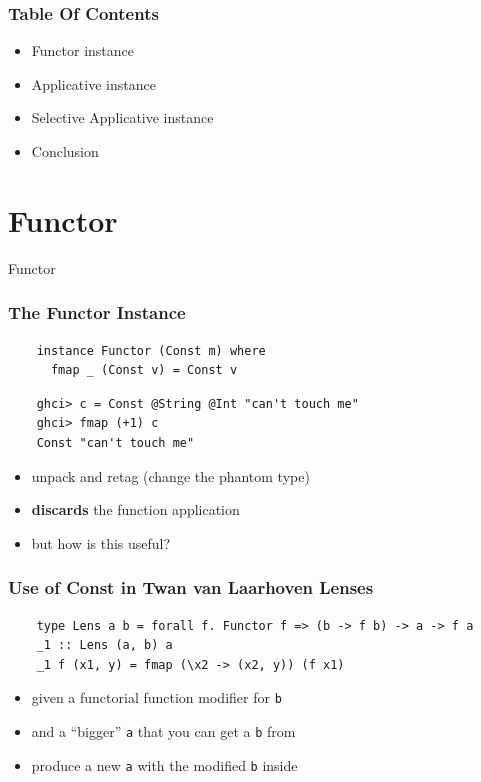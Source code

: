 \documentclass[aspectratio=169]{beamer}
\begin{document}
\begin{frame}
  \frametitle{Table Of Contents}
  \begin{itemize}
  \item Functor instance
  \item Applicative instance
  \item Selective Applicative instance
  \item Conclusion
  \end{itemize}
\end{frame}

\section{Functor}
\begin{frame}
  \begin{center}
    \Huge Functor
  \end{center}
\end{frame}

\begin{frame}[fragile]
  \frametitle{The Functor Instance}
  \begin{verbatim}
    instance Functor (Const m) where
      fmap _ (Const v) = Const v
  \end{verbatim}
  \vspace{5mm}
  \begin{verbatim}
    ghci> c = Const @String @Int "can't touch me"
    ghci> fmap (+1) c
    Const "can't touch me"
  \end{verbatim}
  \vfill
  \begin{itemize}
  \item unpack and retag (change the phantom type)
  \item \textbf{discards} the function application
  \item but how is this useful?
  \end{itemize}
\end{frame}

\begin{frame}[fragile]
  \frametitle{Use of Const in Twan van Laarhoven Lenses}
  \begin{verbatim}
    type Lens a b = forall f. Functor f => (b -> f b) -> a -> f a
    _1 :: Lens (a, b) a
    _1 f (x1, y) = fmap (\x2 -> (x2, y)) (f x1)
  \end{verbatim}

  \begin{itemize}
  \item given a functorial function modifier for \texttt{b}
  \item and a ``bigger'' \texttt{a} that you can get a \texttt{b} from
  \item produce a new \texttt{a} with the modified \texttt{b} inside
  \end{itemize}
\end{frame}
\end{document}
